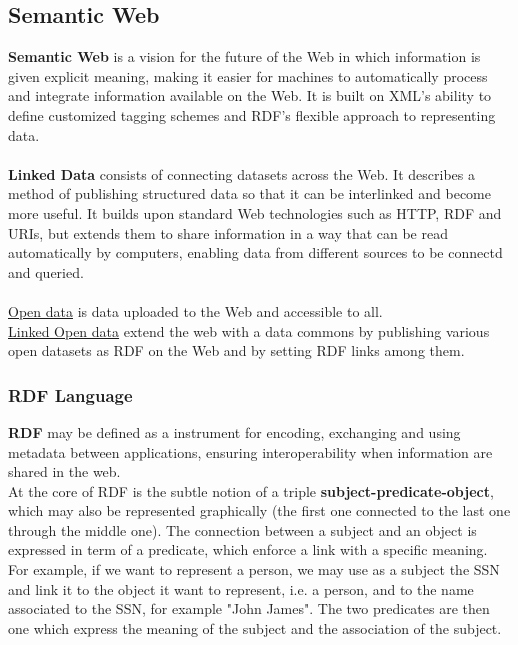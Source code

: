 \documentclass[10pt,a4paper]{article}
\newcommand{\nline}{\\~\\}
\begin{document}
\begin{justify}
\subsection{Semantic Web}
\textbf{Semantic Web} is a vision for the future of the Web in which information is given explicit meaning, making it easier for machines to automatically process and integrate information available on the Web. It is built on XML's ability to define customized tagging schemes and RDF's flexible approach to representing data.
 \nline
\textbf{Linked Data} consists of connecting datasets across the Web. It describes a method of publishing structured data so that it can be interlinked and become more useful. It builds upon standard Web technologies such as HTTP, RDF and URIs, but extends them to share information in a way that can be read automatically by computers, enabling data from different sources to be connectd and queried. \nline
\uline{Open data} is data uploaded to the Web and accessible to all. \\
\uline{Linked Open data} extend the web with a data commons by publishing various open datasets as RDF on the Web and by setting RDF links among them.
\subsubsection{RDF Language}
\textbf{RDF} may be defined as a instrument for encoding, exchanging and using metadata between applications, ensuring interoperability when information are shared in the web. \\
At the core of RDF is the subtle notion of a triple \textbf{subject-predicate-object}, which may also be represented graphically (the first one connected to the last one through the middle one). The connection between a subject and an object is expressed in term of a predicate, which enforce a link with a specific meaning. For example, if we want to represent a person, we may use as a subject the SSN and link it to the object it want to represent, i.e. a person, and to the name associated to the SSN, for example "John James". The two predicates are then one which express the meaning of the subject and the association of the subject.  

\end{justify}
\end{document}
